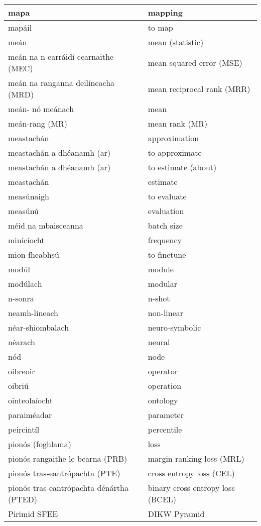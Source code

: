 \begin{longtable}{|l|l|}
		mapa&mapping\\ \hline 
		mapáil&to map\\ \hline 
		meán&mean (statistic)\\ \hline 
		meán na n-earráidí cearnaithe (MEC)&mean squared error (MSE)\\ \hline 
		meán na ranganna deilíneacha (MRD)&mean reciprocal rank (MRR)\\ \hline 
		meán- nó meánach&mean\\ \hline 
		meán-rang (MR)&mean rank (MR)\\ \hline 
		meastachán&approximation\\ \hline 
		meastachán a dhéanamh (ar)&to approximate\\ \hline 
		meastachán a dhéanamh (ar)&to estimate (about)\\ \hline 
		meastachán&estimate\\ \hline 
		measúnaigh&to evaluate\\ \hline 
		measúnú&evaluation\\ \hline 
		méid na mbaisceanna&batch size\\ \hline 
		minicíocht&frequency\\ \hline 
		mion-fheabhsú&to finetune\\ \hline 
		modúl&module\\ \hline 
		modúlach&modular\\ \hline 
		n-sonra&n-shot\\ \hline 
		neamh-líneach&non-linear\\ \hline 
		néar-shiombalach&neuro-symbolic\\ \hline 
		néarach&neural\\ \hline 
		nód&node\\ \hline 
		oibreoir&operator\\ \hline 
		oibriú&operation\\ \hline 
		ointeolaíocht&ontology\\ \hline 
		paraiméadar&parameter\\ \hline 
		peircintíl&percentile\\ \hline 
		pionós (foghlama)&loss\\ \hline 
		pionós rangaithe le bearna (PRB)&margin ranking loss (MRL)\\ \hline 
		pionós tras-eantrópachta (PTE)&cross entropy loss (CEL)\\ \hline 
		pionós tras-eantrópachta dénártha (PTED)&binary cross entropy loss (BCEL)\\ \hline 
		Pirimid SFEE&DIKW Pyramid\\ \hline 

\end{longtable}
